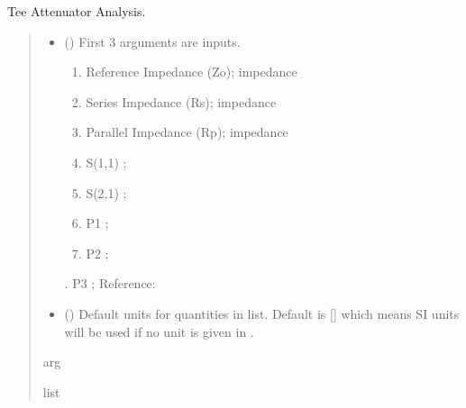 \documentclass[letterpaper,10pt,english]{sphinxmanual}
\begin{document}

\begin{fulllineitems}
\label{\detokenize{components:components.Tee_Attenuator_Analysis}}
\pysigstartsignatures
{}
\pysigstopsignatures
\sphinxAtStartPar
Tee Attenuator Analysis.
\begin{quote}\begin{description}
\begin{itemize}
\item {}
\sphinxAtStartPar
{} () \textendash{}
\sphinxAtStartPar
First 3 arguments are inputs.
\begin{enumerate}
%
\item {}
\sphinxAtStartPar
Reference Impedance (Zo); impedance

\item {}
\sphinxAtStartPar
Series Impedance (Rs); impedance

\item {}
\sphinxAtStartPar
Parallel Impedance (Rp); impedance

\item {}
\sphinxAtStartPar
S(1,1) ;

\item {}
\sphinxAtStartPar
S(2,1) ;

\item {}
\sphinxAtStartPar
P1 ;

\item {}
\sphinxAtStartPar
P2 ;

\end{enumerate}

. P3 ;
Reference:


\item {}
\sphinxAtStartPar
{} (\sphinxstyleliteralemphasis{\sphinxupquote{, }}) \textendash{} Default units for quantities in  list. Default is {[}{]} which means SI units will be used if no unit is given in .

\end{itemize}

\sphinxAtStartPar
arg

\sphinxAtStartPar
list

\end{description}\end{quote}

\end{fulllineitems}
\end{document}
